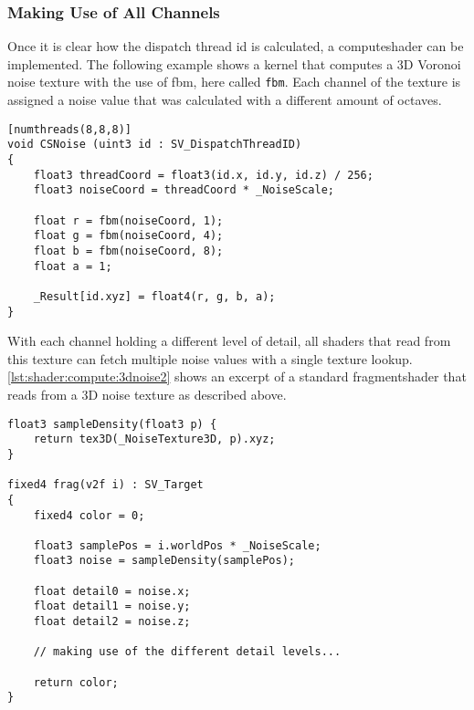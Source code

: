 \begin{figure}[H]
\begin{minipage}{0.47\linewidth}
        \label{img:tikz:compute:threads2}
    \end{minipage}
\end{figure}

\pagebreak

\subsubsection{Making Use of All Channels}
Once it is clear how the dispatch thread id is calculated, a \gls{computeshader} can be implemented.
The following example shows a \gls{kernel} that computes a 3D Voronoi \gls{noise} texture with the use of \gls{fbm}, here called \lstinline[language=HLSL]{fbm}.
Each channel of the texture is assigned a \gls{noise} value that was calculated with a different amount of octaves.

\begin{lstlisting}[language=HLSL, caption=An implementation of a 3D \gls{noise} \gls{computeshader}., label=lst:shader:compute:3dnoise]
[numthreads(8,8,8)]
void CSNoise (uint3 id : SV_DispatchThreadID)
{
    float3 threadCoord = float3(id.x, id.y, id.z) / 256;
    float3 noiseCoord = threadCoord * _NoiseScale;
    
    float r = fbm(noiseCoord, 1);
    float g = fbm(noiseCoord, 4);
    float b = fbm(noiseCoord, 8);
    float a = 1;

    _Result[id.xyz] = float4(r, g, b, a);
}
\end{lstlisting}

\noindent
With each channel holding a different level of detail, all \gls{shader}s that read from this texture can fetch multiple \gls{noise} values with a single texture lookup.
\autoref{lst:shader:compute:3dnoise2} shows an excerpt of a standard \gls{fragmentshader} that reads from a 3D \gls{noise} texture as described above.
\begin{lstlisting}[language=HLSL, caption=An implementation of a shader making use of a 3D noise texture., label=lst:shader:compute:3dnoise2]
float3 sampleDensity(float3 p) {
    return tex3D(_NoiseTexture3D, p).xyz;
}

fixed4 frag(v2f i) : SV_Target
{
    fixed4 color = 0;

    float3 samplePos = i.worldPos * _NoiseScale;
    float3 noise = sampleDensity(samplePos);

    float detail0 = noise.x;
    float detail1 = noise.y;
    float detail2 = noise.z;

    // making use of the different detail levels...

    return color;
}
\end{lstlisting}